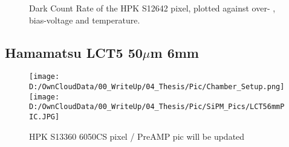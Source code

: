 \documentclass[12pt,article,type=msc,colorback,accentcolor=tud9c]{tudthesis}
\begin{document}
\begin{figure}[h]
\begin{centering}
\caption{Dark Count Rate of the HPK S12642 pixel, plotted against over- , bias-voltage and temperature.}
\label{fig:S12642_OCT}
\end{centering}
\end{figure}
\begin{figure}[h]
\begin{centering}
\caption{}
\label{fig:}
\end{centering}
\end{figure}




\clearpage
\subsection{Hamamatsu LCT5 50$\mu$m 6mm}
\label{subsec:LCT56}
\begin{wrapfigure}{R}{0.65\textwidth}
\centering
\texttt{[image: D:/OwnCloudData/00\_WriteUp/04\_Thesis/Pic/Chamber\_Setup.png]}
\texttt{[image: D:/OwnCloudData/00\_WriteUp/04\_Thesis/Pic/SiPM\_Pics/LCT56mmPIC.JPG]}
\caption{\label{fig:S13360_pixel}HPK S13360 6050CS pixel / PreAMP pic will be updated}
\end{wrapfigure}
\end{document}
